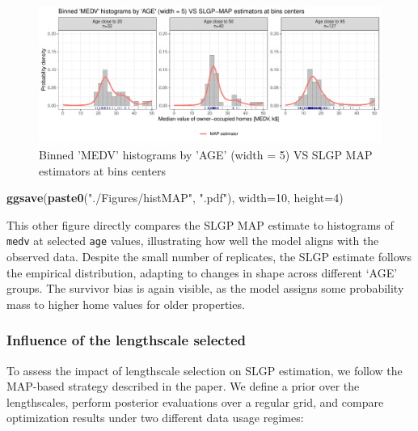 \documentclass[
]{article}
\newenvironment{Shaded}{\begin{snugshade}}{\end{snugshade}}
\newcommand{\AttributeTok}[1]{\textcolor[rgb]{0.13,0.29,0.53}{#1}}
\newcommand{\DecValTok}[1]{\textcolor[rgb]{0.00,0.00,0.81}{#1}}
\newcommand{\FunctionTok}[1]{\textcolor[rgb]{0.13,0.29,0.53}{\textbf{#1}}}
\newcommand{\NormalTok}[1]{#1}
\newcommand{\StringTok}[1]{\textcolor[rgb]{0.31,0.60,0.02}{#1}}
\begin{document}
\begin{figure}[H]

{\centering \includegraphics{IntroductionSLGP_files/figure-latex/SLGPplottingMAP-1} 

}

\caption{Binned 'MEDV' histograms by 'AGE' (width = 5) VS SLGP MAP estimators at bins centers}\label{fig:SLGPplottingMAP}
\end{figure}

\begin{Shaded}
\begin{Highlighting}[]

\FunctionTok{ggsave}\NormalTok{(}\FunctionTok{paste0}\NormalTok{(}\StringTok{"./Figures/histMAP"}\NormalTok{,  }\StringTok{".pdf"}\NormalTok{), }\AttributeTok{width=}\DecValTok{10}\NormalTok{, }\AttributeTok{height=}\DecValTok{4}\NormalTok{)}
\end{Highlighting}
\end{Shaded}

This other figure directly compares the SLGP MAP estimate to histograms of \texttt{medv} at selected \texttt{age} values, illustrating how well the model aligns with the observed data. Despite the small number of replicates, the SLGP estimate follows the empirical distribution, adapting to changes in shape across different `AGE' groups. The survivor bias is again visible, as the model assigns some probability mass to higher home values for older properties.

\subsubsection{Influence of the lengthscale selected}\label{influence-of-the-lengthscale-selected}

To assess the impact of lengthscale selection on SLGP estimation, we follow the MAP-based strategy described in the paper. We define a prior over the lengthscales, perform posterior evaluations over a regular grid, and compare optimization results under two different data usage regimes:
\end{document}
